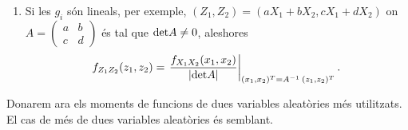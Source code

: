 \begin{enumerate}
\item Si les $g_i$ s\'on lineals, per exemple, $(Z_1, Z_2) = (a X_1 + b X_2, c
X_1
+ d X_2)$ on $A = \left ( \begin{array}{cc} a & b \\ c & d \end{array} \right )$
\'es tal que ${\rm det} A \not = 0$, aleshores
$$f_{Z_1Z_2}(z_1, z_2) = \left. {f_{X_1X_2}(x_1, x_2) \over |{\rm det} A|}
\right|_{(x_1, x_2)^T = A^{-1} \> (z_1, z_2)^T}.$$

\end{enumerate}

Donarem ara els moments de funcions de dues variables aleat\`ories m\'es
utilitzats.
El cas de m\'es de dues variables aleat\`ories \'es semblant.

